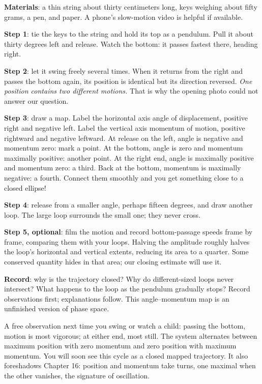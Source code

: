 \begin{experiment}
\textbf{Materials}: a thin string about thirty centimeters long, keys weighing about fifty grams, a pen, and paper. A phone's slow-motion video is helpful if available.

\textbf{Step 1}: tie the keys to the string and hold its top as a pendulum. Pull it about thirty degrees left and release. Watch the bottom: it passes fastest there, heading right.

\textbf{Step 2}: let it swing freely several times. When it returns from the right and passes the bottom again, its position is identical but its direction reversed. \emph{One position contains two different motions.} That is why the opening photo could not answer our question.

\textbf{Step 3}: draw a map. Label the horizontal axis angle of displacement, positive right and negative left. Label the vertical axis momentum of motion, positive rightward and negative leftward. At release on the left, angle is negative and momentum zero: mark a point. At the bottom, angle is zero and momentum maximally positive: another point. At the right end, angle is maximally positive and momentum zero: a third. Back at the bottom, momentum is maximally negative: a fourth. Connect them smoothly and you get something close to a closed ellipse!

\textbf{Step 4}: release from a smaller angle, perhaps fifteen degrees, and draw another loop. The large loop surrounds the small one; they never cross.

\textbf{Step 5, optional}: film the motion and record bottom-passage speeds frame by frame, comparing them with your loops. Halving the amplitude roughly halves the loop's horizontal and vertical extents, reducing its area to a quarter. Some conserved quantity hides in that area; our closing estimate will use it.

\textbf{Record}: why is the trajectory closed? Why do different-sized loops never intersect? What happens to the loop as the pendulum gradually stops? Record observations first; explanations follow. This angle--momentum map is an unfinished version of phase space.
\end{experiment}

A free observation next time you swing or watch a child: passing the bottom, motion is most vigorous; at either end, most still. The system alternates between maximum position with zero momentum and zero position with maximum momentum. You will soon see this cycle as a closed mapped trajectory. It also foreshadows Chapter 16: position and momentum take turns, one maximal when the other vanishes, the signature of oscillation.

